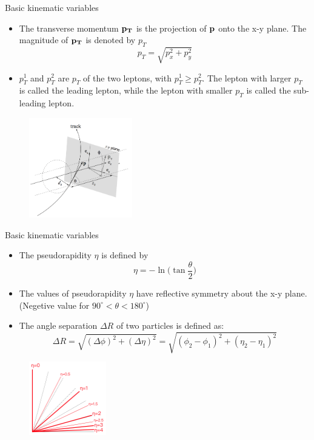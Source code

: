 \documentclass[mathserif,serif]{beamer}
\begin{document}
\begin{frame}{Basic kinematic variables}
\begin{itemize}
\item The transverse momentum $\bf{p}_T$ is the projection of $\bf{p}$ onto the x-y plane. The magnitude of $\bf{p}_T$ is denoted by $p_T$
\begin{equation*}
p_T = \sqrt{p_x^2 + p_y^2}
\end{equation*}
\item $p_T^1$ and $p_T^2$ are $p_T$ of the two leptons, with $p_T^1 \geq p_T^2$. The lepton with larger $p_T$ is called the leading lepton, while the lepton with smaller $p_T$ is called the sub-leading lepton.
\end{itemize}
\begin{figure}
\centering
\includegraphics[width=0.4\textwidth]{data/photo/detector/impact_parameter.png}
\end{figure}
\end{frame}

\begin{frame}{Basic kinematic variables}
\begin{itemize}
\item The pseudorapidity $\eta$ is defined by
\begin{equation*}
\eta = - \ln \Big( \tan \frac{\theta}{2} \Big)
\end{equation*}
\item The values of pseudorapidity $\eta$ have reflective symmetry about the x-y plane. (Negetive value for $90^{\circ} <\theta< 180^{\circ}$)
\item The angle separation $\Delta R$ of two particles is defined as:
\begin{equation*}
\Delta R = \sqrt{(\Delta \phi) ^2 + (\Delta \eta) ^2}  = \sqrt{(\phi_2 -\phi_1) ^2 + (\eta_2 - \eta_1) ^2}
\end{equation*}
\end{itemize}
\begin{figure}
\centering
\includegraphics[width=0.3\textwidth]{data/photo/detector/pseudorapidity.png}
\end{figure}
\end{frame}
\end{document}
